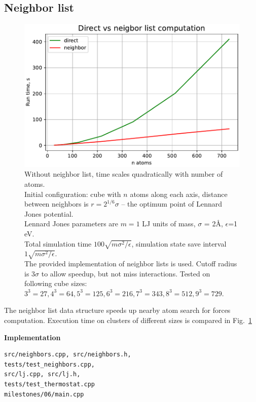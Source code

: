 \documentclass[12pt,a4paper]{article}
\begin{document}
\clearpage

\subsection*{Neighbor list}

\begin{figure}[htb]
	\centering
	\includegraphics[width=.8\linewidth]{img/milestone06-time.pdf}
	\caption{Without neighbor list, time scales quadratically with number of atoms.\\
	Initial configuration: cube with $n$ atoms along each axis, distance between neighbors is $r=2^{1/6}\sigma$ -- the optimum point of Lennard Jones potential.\\	
	Lennard Jones parameters are $m=1$  LJ units of mass, $\sigma$ = 2Å, $\epsilon$=1 eV.\\
	Total simulation time \( 100 \sqrt{m\sigma^2 / \epsilon} \), simulation state save interval \( 1 \sqrt{m\sigma^2 / \epsilon} \).\\
	The provided implementation of neighbor lists is used. Cutoff radius is \( 3 \sigma \) to allow speedup, but not miss interactions. Tested on following cube sizes: $3^3=27, 4^3=64, 5^3=125, 6^3=216, 7^3=343, 8^3=512, 9^3=729$.
	}
	\label{fig:neighbor}
\end{figure}

The neighbor list data structure speeds up nearby atom search for forces computation. Execution time on clusters of different sizes is compared in Fig.~\ref{fig:neighbor}

{\bf Implementation}
\begin{lstlisting}[breaklines]
src/neighbors.cpp, src/neighbors.h,
tests/test_neighbors.cpp,
src/lj.cpp, src/lj.h,
tests/test_thermostat.cpp
milestones/06/main.cpp
\end{lstlisting}
\end{document}

